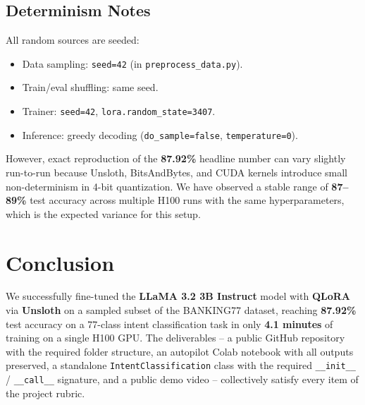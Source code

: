 \documentclass[12pt,a4paper]{article}
\begin{document}
\subsection{Determinism Notes}

All random sources are seeded:
\begin{itemize}[noitemsep]
    \item Data sampling: \texttt{seed=42} (in \texttt{preprocess\_data.py}).
    \item Train/eval shuffling: same seed.
    \item Trainer: \texttt{seed=42}, \texttt{lora.random\_state=3407}.
    \item Inference: greedy decoding (\texttt{do\_sample=false},
          \texttt{temperature=0}).
\end{itemize}
However, exact reproduction of the \textbf{87.92\%} headline number can vary
slightly run-to-run because Unsloth, BitsAndBytes, and CUDA kernels introduce
small non-determinism in 4-bit quantization. We have observed a stable range
of \textbf{87--89\%} test accuracy across multiple H100 runs with the same
hyperparameters, which is the expected variance for this setup.

\section{Conclusion}
\label{sec:conclusion}

We successfully fine-tuned the \textbf{LLaMA 3.2 3B Instruct} model with
\textbf{QLoRA} via \textbf{Unsloth} on a sampled subset of the BANKING77
dataset, reaching \textbf{87.92\%} test accuracy on a 77-class intent
classification task in only \textbf{4.1 minutes} of training on a single H100
GPU. The deliverables -- a public GitHub repository with the required folder
structure, an autopilot Colab notebook with all outputs preserved, a
standalone \texttt{IntentClassification} class with the required
\texttt{\_\_init\_\_} / \texttt{\_\_call\_\_} signature, and a public demo
video -- collectively satisfy every item of the project rubric.
\end{document}
